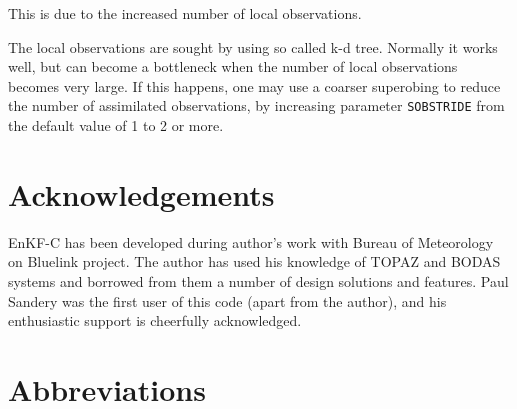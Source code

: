 \documentclass[11pt]{report}
\begin{document}
This is due to the increased number of local observations.

The local observations are sought by using so called k-d tree.
Normally it works well, but can become a bottleneck when the number of local observations becomes very large.
If this happens, one may use a coarser superobing to reduce the number of assimilated observations, by increasing parameter \verb|SOBSTRIDE| from the default value of 1 to 2 or more.

\chapter*{Acknowledgements}

EnKF-C has been developed during author's work with Bureau of Meteorology on Bluelink project.
The author has used his knowledge of TOPAZ \citep{sak12b} and BODAS \citep{oke08b} systems and borrowed from them a number of design solutions and features.
Paul Sandery was the first user of this code (apart from the author), and his enthusiastic support is cheerfully acknowledged.

\clearpage

\nocite{eve94a}
\nocite{eve03a}
\nocite{hun04a}
\nocite{hun07a}
\nocite{sak08a}
\nocite{sak10a}
\nocite{sak11a}




\clearpage

\chapter*{Abbreviations}
\end{document}
